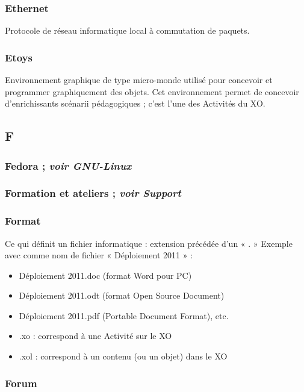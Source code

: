 \documentclass[12pt]{article}
\begin{document}
\subsubsection{Ethernet}
\label{sec-14-5-2}


Protocole de réseau informatique local à commutation de paquets.
\subsubsection{Etoys}
\label{sec-14-5-3}


Environnement graphique de type micro-monde utilisé pour concevoir et
programmer graphiquement des objets. Cet environnement permet de concevoir
d'enrichissants scénarii pédagogiques ; c'est l'une des Activités du XO.
\subsection{F}
\label{sec-14-6}
\subsubsection{Fedora ; \emph{voir GNU-Linux}}
\label{sec-14-6-1}
\subsubsection{Formation et ateliers ; \emph{voir Support}}
\label{sec-14-6-2}
\subsubsection{Format}
\label{sec-14-6-3}


Ce qui définit un fichier informatique : extension précédée d'un « . »
Exemple avec comme nom de fichier « Déploiement 2011 » :

\begin{itemize}
\item Déploiement 2011.doc (format Word pour PC)
\item Déploiement 2011.odt (format Open Source Document)
\item Déploiement 2011.pdf (Portable Document Format), etc.
\item .xo : correspond à une Activité sur le XO
\item .xol : correspond à un contenu (ou un objet) dans le XO
\end{itemize}
\subsubsection{Forum}
\label{sec-14-6-4}
\end{document}
